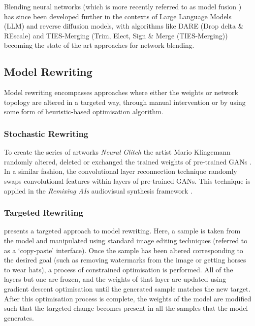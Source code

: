 Blending neural networks (which is more recently referred to as model fusion \citep{li2023deep}) has since been developed further in the contexts of Large Language Models (LLM) and reverse diffusion models, with algorithms like DARE (Drop delta \& REscale) \citep{yu2024language} and TIES-Merging (Trim, Elect, Sign \& Merge (TIES-Merging)) becoming the state of the art approaches for network blending.

\subsection{Model Rewriting}
\label{survey:rewriting}

Model rewriting encompasses approaches where either the weights or network topology are altered in a targeted way, through manual intervention or by using some form of heuristic-based optimisation algorithm. 

\subsubsection{Stochastic Rewriting} 

To create the series of artworks \textit{Neural Glitch} the artist Mario Klingemann randomly altered, deleted or exchanged the trained weights of pre-trained GANs \citep{klingemann2018neural}. 
In a similar fashion, the convolutional layer reconnection technique \citep{ruzika2020gan} randomly swaps convolutional features within layers of pre-trained GANs. 
This technique is applied in the \textit{Remixing AIs} audiovisual synthesis framework \citep{collins2020remixing}.

\subsubsection{Targeted Rewriting} 
\citet{bau2020rewriting} presents a targeted approach to model rewriting. 
Here, a sample is taken from the model and manipulated using standard image editing techniques (referred to as a `copy-paste' interface). 
Once the sample has been altered corresponding to the desired goal (such as removing watermarks from the image or getting horses to wear hats), a process of constrained optimisation is performed. 
All of the layers but one are frozen, and the weights of that layer are updated using gradient descent optimisation until the generated sample matches the new target. 
After this optimisation process is complete, the weights of the model are modified such that the targeted change becomes present in all the samples that the model generates.

